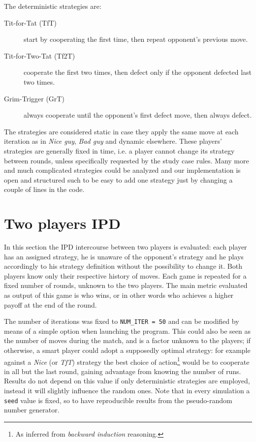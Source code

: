 \documentclass[journal,10pt,twoside]{IEEEtran}
\begin{document}
The deterministic strategies are:
\begin{description}
    \item[Tit-for-Tat (TfT)] start by cooperating the first time, then repeat opponent's previous move.
    \item[Tit-for-Two-Tat (Tf2T)] cooperate the first two times, then defect only if the opponent defected last two times.
    \item[Grim-Trigger (GrT)] always cooperate until the opponent's first defect move, then always defect. 
\end{description}

The strategies are considered static in case they apply the same move at each iteration as in \textit{Nice guy}, \textit{Bad guy} and dynamic elsewhere.
These players' strategies are generally fixed in time, i.e. a player cannot change its strategy between rounds, unless specifically requested by the study case rules.%
Many more and much complicated strategies could be analyzed and our implementation is open and structured such to be easy to add one strategy just by changing a couple of lines in the code.

\section{Two players IPD} \label{s:IPD2P}
In this section the IPD intercourse between two players is evaluated: each player has an assigned strategy, he is unaware of the opponent's strategy and he plays accordingly to his strategy definition without the possibility to change it. Both players know only their respective history of moves. Each game is repeated for a fixed number of rounds, unknown to the two players. The main metric evaluated as output of this game is who wins, or in other words who achieves a higher payoff at the end of the round.

The number of iterations was fixed to \texttt{NUM\_ITER = 50} and can be modified by means of a simple option when launching the program.
This could also be seen as the number of moves during the match, and is a factor unknown to the players; if otherwise, a smart player could adopt a supposedly optimal strategy: for example against a \textit{Nice} (or \textit{TfT}) strategy the best choice of action\footnote{As inferred from \textit{backward induction} reasoning.} would be to cooperate in all but the last round, gaining advantage from knowing the number of runs.
Results do not depend on this value if only deterministic strategies are employed, instead it will slightly influence the random ones.
Note that in every simulation a \texttt{seed} value is fixed, so to have reproducible results from the pseudo-random number generator.
\end{document}
